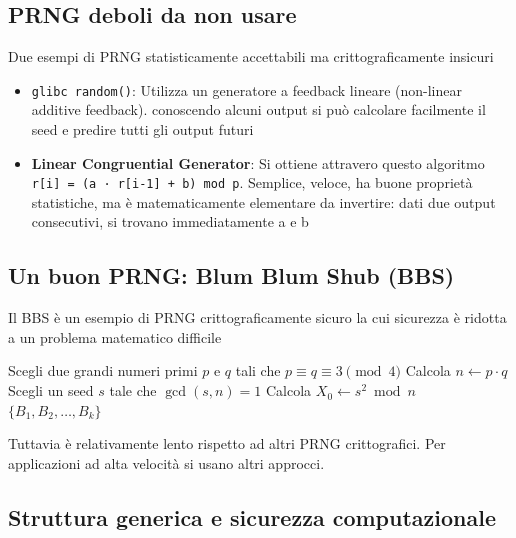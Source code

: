 \subsection{PRNG deboli da non usare}
Due esempi di PRNG statisticamente accettabili ma crittograficamente insicuri

\begin{itemize}
  \item \texttt{glibc random()}: Utilizza un generatore a feedback lineare (non-linear additive feedback). conoscendo alcuni output si può calcolare facilmente il seed e predire tutti gli output futuri
  \item \textbf{Linear Congruential Generator}:
  Si ottiene attravero questo algoritmo \texttt{r[i] = (a · r[i-1] + b) mod p}. Semplice, veloce, ha buone proprietà statistiche, ma è matematicamente elementare da invertire: dati due output consecutivi, si trovano immediatamente a e b
\end{itemize}

\subsection{Un buon PRNG: Blum Blum Shub (BBS)}
Il BBS è un esempio di PRNG crittograficamente sicuro la cui sicurezza è ridotta a un problema matematico difficile

\begin{algorithm}
\caption{Generatore Blum Blum Shub}
Scegli due grandi numeri primi $p$ e $q$ tali che $p \equiv q \equiv 3 \pmod{4}$\;
Calcola $n \gets p \cdot q$\;
Scegli un seed $s$ tale che $\gcd(s,n)=1$\;
Calcola $X_0 \gets s^2 \bmod n$\;
\KwRet $\{B_1, B_2, \dots, B_k\}$\;
\end{algorithm}



Tuttavia è relativamente lento rispetto ad altri PRNG crittografici. Per applicazioni ad alta velocità si usano altri approcci.

\subsection{Struttura generica e sicurezza computazionale}


